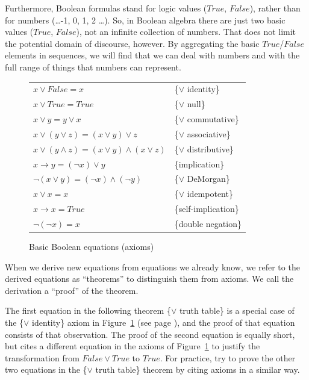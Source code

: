 Furthermore, Boolean formulas stand for logic values
($True$, $False$), rather than for numbers (\dots -1, 0, 1, 2 \dots).
So, in Boolean algebra there are just two basic values ($True$, $False$),
not an infinite collection of numbers.
That does not limit the potential domain of discourse, however. By
aggregating the basic $True$/$False$ elements in sequences, we
will find that we can deal with numbers and with the full range of things that
numbers can represent.

\begin{figure}
\begin{center}
\begin{tabular}{ll}
$x \vee False = x$                                   & \{$\vee$ identity\} \\
$x \vee True = True$                                 & \{$\vee$ null\} \\
$x \vee y = y \vee x$                                & \{$\vee$ commutative\} \\
$x \vee (y \vee z) = (x \vee y) \vee z$              & \{$\vee$ associative\} \\
$x \vee (y \wedge z) = (x \vee y) \wedge (x \vee z)$ & \{$\vee$ distributive\} \\
$x \rightarrow y = (\neg x) \vee y$                  & \{implication\} \\
$\neg(x \vee y) = (\neg x) \wedge (\neg y)$          & \{$\vee$ DeMorgan\} \\
$x \vee x = x$                                       & \{$\vee$ idempotent\} \\
$x \rightarrow x = True$                             & \{self-implication\} \\
$\neg(\neg x)  = x$                                  & \{double negation\} \\
\end{tabular}
\end{center}
\caption{Basic Boolean equations (axioms)}
\label{fig-02-03}
\end{figure}

When we derive new equations from equations we already know,
we refer to the derived equations as ``theorems'' to
distinguish them from axioms. We call the derivation a
``proof'' of the theorem.

The first equation in the
following theorem \{$\vee$ truth table\} is a special case of the
\{$\vee$ identity\} axiom in Figure~\ref{fig-02-03} (see page \pageref{fig-02-03}),
and the proof of that equation consists of that observation. The proof of the
second equation is equally short, but cites
a different equation in the axioms of Figure~\ref{fig-02-03}
to justify the transformation from $False \vee True$
to $True$.
For practice, try to prove the other two
equations in the \{$\vee$ truth table\} theorem by citing axioms
in a similar way.

